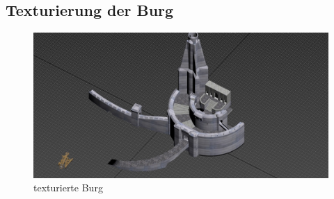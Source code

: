 \subsection{Texturierung der Burg}

\begin{figure}[h]
	\centering
	\includegraphics[width=0.95 \linewidth]{Abbildungen/3dsMax/Burg_final}
	\caption{texturierte Burg}
	\label{fig:Burg_final}
\end{figure}
 